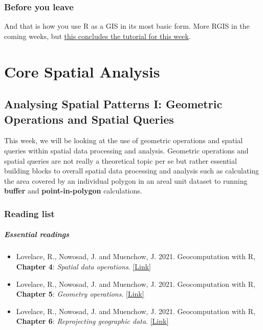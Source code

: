 \documentclass[
]{book}
\providecommand{\tightlist}{%
  \setlength{\itemsep}{0pt}\setlength{\parskip}{0pt}}
\begin{document}
\hypertarget{byl-w05}{%
\section{Before you leave}\label{byl-w05}}

And that is how you use R as a GIS in its most basic form. More RGIS in the coming weeks, but \href{https://www.youtube.com/watch?v=Ydg4T2MP7Z8}{this concludes the tutorial for this week}.

\hypertarget{part-core-spatial-analysis}{%
\part*{Core Spatial Analysis}\label{part-core-spatial-analysis}}

\hypertarget{analysing-spatial-patterns-i-geometric-operations-and-spatial-queries}{%
\chapter{Analysing Spatial Patterns I: Geometric Operations and Spatial Queries}\label{analysing-spatial-patterns-i-geometric-operations-and-spatial-queries}}

This week, we will be looking at the use of geometric operations and spatial queries within spatial data processing and analysis. Geometric operations and spatial queries are not really a theoretical topic per se but rather essential building blocks to overall spatial data processing and analysis such as calculating the area covered by an individual polygon in an areal unit dataset to running \textbf{buffer} and \textbf{point-in-polygon} calculations.

\hypertarget{reading-w06}{%
\section{Reading list}\label{reading-w06}}

\hypertarget{essential-readings-5}{%
\subsubsection*{Essential readings}\label{essential-readings-5}}

\begin{itemize}
\tightlist
\item
  Lovelace, R., Nowosad, J. and Muenchow, J. 2021. Geocomputation with R, \textbf{Chapter 4}: \emph{Spatial data operations}. \href{https://geocompr.robinlovelace.net/spatial-operations.html}{{[}Link{]}}
\item
  Lovelace, R., Nowosad, J. and Muenchow, J. 2021. Geocomputation with R, \textbf{Chapter 5}: \emph{Geometry operations}. \href{https://geocompr.robinlovelace.net/geometric-operations.html}{{[}Link{]}}
\item
  Lovelace, R., Nowosad, J. and Muenchow, J. 2021. Geocomputation with R, \textbf{Chapter 6}: \emph{Reprojecting geographic data}. \href{https://geocompr.robinlovelace.net/reproj-geo-data.html}{{[}Link{]}}
\end{itemize}
\end{document}
